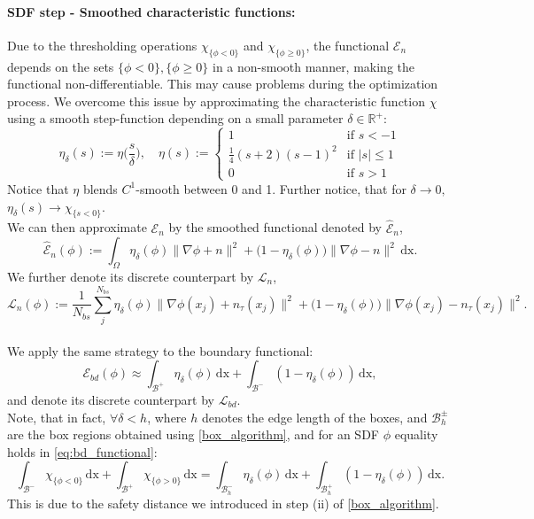 \documentclass[draft,12pt,openany]{book}
\theoremstyle{plainnormal}
\theoremstyle{remark}
\begin{document}
\paragraph{SDF step - Smoothed characteristic functions:} Due to the thresholding operations $\chi_{\{\phi<0\}}$ and $\chi_{\{\phi\geq 0\}}$, the functional $\mathcal E_n$ depends on the sets $\{\phi<0\}, \{\phi\geq0\}$ in a non-smooth manner, making the functional non-differentiable. This may cause problems during the optimization process. We overcome this issue by approximating the characteristic function $\chi$ using a smooth step-function depending on a small parameter $\delta \in \mathbb R^+$:
$$\eta_\delta(s) := \eta\Big(\frac{s}{\delta}\Big), \quad \eta(s) :=
    \begin{cases}
1 & \text{if } s < -1 \\
\frac{1}{4} (s+2)(s-1)^2 & \text{if } |s| \leq 1 \\
0 & \text{if }s > 1
\end{cases}
$$
Notice that $\eta$ blends $C^1$-smooth between 0 and 1. Further notice, that for $\delta \rightarrow 0,$ $\eta_\delta(s) \rightarrow\chi_{\{s<0\}}$.\\
We can then approximate $\mathcal E_n$ by the smoothed functional denoted by $\hat {\mathcal{E}}_n$,
$$\hat{\mathcal E}_n(\phi) := \int_\Omega \eta_\delta(\phi)\|\nabla \phi + n\|^2 + \big(1 - \eta_\delta(\phi)\big)\|\nabla \phi - n\|^2 \, \mathrm{dx}.$$
We further denote its discrete counterpart by $\mathcal{L}_n$, $$\mathcal L_n(\phi) := \frac{1}{N_{bs}}\sum_j^{N_{bs}}
\eta_\delta(\phi) \|\nabla \phi(x_j) + n_\tau(x_j)\|^2 + \big(1 - \eta_\delta(\phi)\big) \|\nabla \phi(x_j) - n_\tau(x_j)\|^2.$$\\
We apply the same strategy to the boundary functional: 
\begin{equation}\label{eq:bd_functional}
    \mathcal{E}_{bd}(\phi) \approx \int_\mathcal{B^+} \eta_\delta(\phi) \,\mathrm{dx} + \int_{\mathcal{B^-}}(1-\eta_\delta(\phi)) \,\mathrm{dx},
\end{equation}
and denote its discrete counterpart by $\mathcal{L}_{bd}$.\\
Note, that in fact, $\forall \delta < h$, where $h$ denotes the edge length of the boxes, and $\mathcal{B}_h^{\pm}$ are the box regions obtained using \cref{box_algorithm}, and for an SDF $\phi$ equality holds in \cref{eq:bd_functional}:
 $$\int_{\mathcal B^-}\chi_{\{\phi < 0\}}\,\mathrm{dx} + \int_{\mathcal B^+}\chi_{\{\phi > 0\}} \,\mathrm{dx} = \int_{\mathcal{B}^{-}_h} \eta_\delta(\phi) \,\mathrm{dx} + \int_{\mathcal{B}^{+}_h}(1-\eta_\delta(\phi)) \,\mathrm{dx}.$$
This is due to the safety distance we introduced in step (ii) of \cref{box_algorithm}. 
\end{document}
